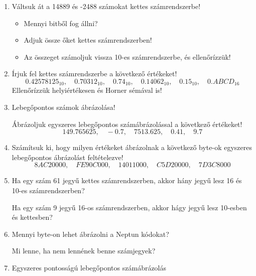 \documentclass[a4paper]{article}
\newenvironment{solution}
{\color{RoyalBlue}}{\bigskip}
\begin{document}
\begin{enumerate}
\begin{solution}
Megmutatni a helyiértékes és a Horner-sémás átírást is!
\end{solution}

\item

Váltsuk át a 14889 és -2488 számokat kettes számrendszerbe!
\begin{itemize}
	\item Mennyi bitből fog állni?
	\item Adjuk össze őket kettes számrendszerben!
	\item Az összeget számoljuk vissza 10-es számrendszerbe, és ellenőrízzük!
\end{itemize}

\item

Írjuk fel kettes számrendszerbe a következő értékeket!
$$
0.42578125_{10}, \quad
0.70312_{10}, \quad
0.74_{10}, \quad
0.14062_{10}, \quad
0.15_{10}, \quad
0.ABCD_{16}
$$
Ellenőrízzük helyiértékesen és Horner sémával is!

\item

Lebegőpontos számok ábrázolása!

Ábrázoljuk egyszeres lebegőpontos számábrázolással a következő értékeket!
$$
149.765625, \quad
-0.7, \quad
7513.625, \quad
0.41, \quad
9.7
$$

\item

Számítsuk ki, hogy milyen értékeket ábrázolnak a következő byte-ok egyszeres lebegőpontos ábrázolást feltételezve!
$$
8AC20000, \quad FE90C000, \quad 14011000, \quad C5D20000, \quad 7D3C8000
$$

\item

Ha egy szám 61 jegyű kettes számrendszerben, akkor hány jegyű lesz 16 és 10-es számrendszerben?

\medskip

Ha egy szám 9 jegyű 16-os számrendszerben, akkor hágy jegyű lesz 10-esben és kettesben?

\item

Mennyi byte-on lehet ábrázolni a Neptun kódokat?

\medskip

Mi lenne, ha nem lennének benne számjegyek?

\item

Egyszeres pontosságú lebegőpontos számábrázolás


\end{enumerate}
\end{document}
